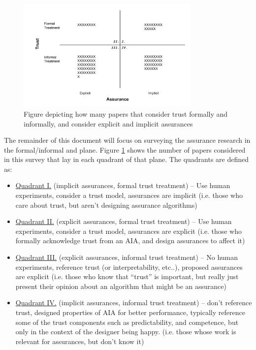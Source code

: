 \begin{figure}[htbp]
    \centering
    \includegraphics[width=0.8\textwidth]{Figures/Trust_vs_Assurance_Intention.pdf}
    \caption{Figure depicting how many papers that consider trust formally and informally, and consider explicit and implicit assurances}
    \label{fig:trust_assurance_intention}
\end{figure}

The remainder of this document will focus on surveying the assurance research in the formal/informal  and  plane. Figure \ref{fig:trust_assurance_intention} shows the number of papers considered in this survey that lay in each quadrant of that plane. The quadrants are defined as:

\begin{itemize}
    \item \hyperref[sec:q1]{Quadrant I.} (implicit assurances, formal trust treatment) -- Use human experiments, consider a trust model, assurances are implicit (i.e. those who care about trust, but aren't designing assurance algorithms)
    \item \hyperref[sec:q2]{Quadrant II.} (explicit assurances, formal trust treatment) -- Use human experiments, consider a trust model, assurances are explicit (i.e. those who formally acknowledge trust from an AIA, and design assurances to affect it)
    \item \hyperref[sec:q3]{Quadrant III.} (explicit assurances, informal trust treatment) -- No human experiments, reference trust (or interpretability, etc..), proposed assurances are explicit (i.e. those who know that ``trust'' is important, but really just present their opinion  about an algorithm that might be an assurance)
    \item \hyperref[sec:q4]{Quadrant IV.} (implicit assurances, informal trust treatment) -- don't reference trust, designed properties of AIA for better performance, typically reference some of the trust components such as predictability, and competence, but only in the context of the designer being happy. (i.e. those whose work is relevant for assurances, but don't know it)
\end{itemize}

